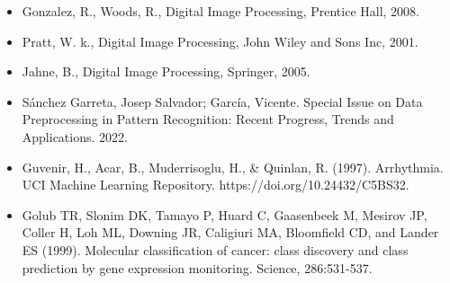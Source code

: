 \begin{itemize}
    \item Gonzalez, R., Woods, R., Digital Image Processing, Prentice Hall, 2008.
    \item Pratt, W. k., Digital Image Processing, John Wiley and Sons Inc, 2001.
    \item Jahne, B., Digital Image Processing, Springer, 2005.
    \item Sánchez Garreta, Josep Salvador; García, Vicente. Special Issue on Data Preprocessing in Pattern Recognition: Recent Progress, Trends and Applications. 2022.
    \item Guvenir, H., Acar, B., Muderrisoglu, H., \& Quinlan, R. (1997). Arrhythmia. UCI Machine Learning Repository. https://doi.org/10.24432/C5BS32.
    \item Golub TR, Slonim DK, Tamayo P, Huard C, Gaasenbeek M, Mesirov JP, Coller H, Loh ML, Downing JR, Caligiuri MA, Bloomfield CD, and Lander ES (1999). Molecular classification of cancer: class discovery and class prediction by gene expression monitoring. Science, 286:531-537.
\end{itemize}
